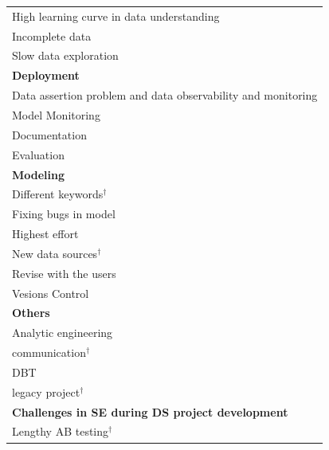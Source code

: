 \documentclass[11pt]{article}
\begin{document}
\begin{longtable}{@{}p{15cm}@{}}
\hspace*{3.0em}High learning curve in data understanding \\
\hspace*{3.0em}Incomplete data \\
\hspace*{3.0em}Slow data exploration \\
\hspace*{1.5em}\textbf{Deployment} \\
\hspace*{3.0em}Data assertion problem and data observability and monitoring \\
\hspace*{3.0em}Model Monitoring \\
\hspace*{1.5em}Documentation \\
\hspace*{1.5em}Evaluation \\
\hspace*{1.5em}\textbf{Modeling} \\
\hspace*{3.0em}Different keywords$^\dagger$ \\
\hspace*{3.0em}Fixing bugs in model \\
\hspace*{3.0em}Highest effort \\
\hspace*{3.0em}New data sources$^\dagger$ \\
\hspace*{3.0em}Revise with the users \\
\hspace*{3.0em}Vesions Control \\
\hspace*{1.5em}\textbf{Others} \\
\hspace*{3.0em}Analytic engineering \\
\hspace*{3.0em}communication$^\dagger$ \\
\hspace*{3.0em}DBT \\
\hspace*{3.0em}legacy project$^\dagger$ \\
\hspace*{0.0em}\textbf{Challenges in SE during DS project development} \\
\hspace*{1.5em}Lengthy AB testing$^\dagger$ \\

\end{longtable}
\end{document}
